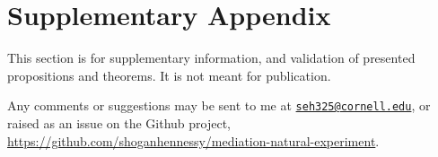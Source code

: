 \onehalfspacing
\appendix
\setcounter{table}{0}
\renewcommand{\thetable}{A\arabic{table}}
\setcounter{figure}{0}
\renewcommand{\thefigure}{A\arabic{figure}}

\section{Supplementary Appendix}
\label{appendix}
This section is for supplementary information, and validation of presented propositions and theorems.
It is not meant for publication.

Any comments or suggestions may be sent to me at \href{mailto:seh325@cornell.edu}{\nolinkurl{seh325@cornell.edu}},
or raised as an issue on the Github project,
\url{https://github.com/shoganhennessy/mediation-natural-experiment}.

%
%


